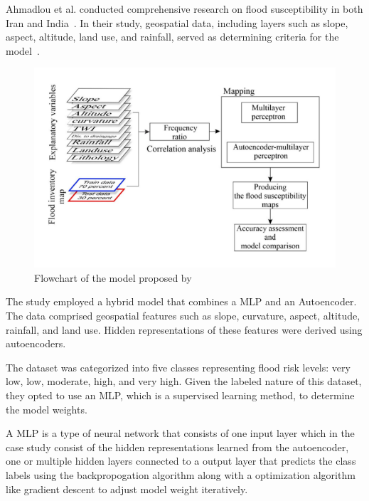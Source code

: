 \documentclass[a4paper,12pt]{Classes/RoboticsLaTeX}
\begin{document}
	Ahmadlou et al. conducted comprehensive research on flood susceptibility in both Iran and India~\cite{ahmadlou2020}. In their study, geospatial data, including layers such as 
	slope, aspect, altitude, land use, and rainfall, served as determining criteria for the model~\cite{ahmadlou2020}.

	\begin{figure}[H]
		\centering
		\includegraphics[width=1\textwidth]{Figures/AutoEncoder.png} %
		\caption{Flowchart of the model proposed by\cite{ahmadlou2020}}
		\label{fig:my_label8} %
	\end{figure}

	The study employed a hybrid model that combines a \ac{MLP} and an Autoencoder. 
	The data comprised geospatial features such as slope, curvature, aspect, altitude, rainfall, and 
	land use. Hidden representations of these features were derived using autoencoders.

	The dataset was categorized into five classes representing flood risk levels: very low, low, moderate, high, and very high. Given the labeled nature of this dataset, 
	they opted to use an \ac{MLP}, which is a supervised learning method, to determine the model weights.

	A \ac{MLP} is a type of neural network that consists of one input layer which in the case study consist
	of the hidden representations learned from the autoencoder, one or multiple hidden layers connected to a 
	output layer that predicts the class labels using the backpropogation algorithm along with a optimization
	algorithm like gradient descent to adjust model weight iteratively.
\end{document}
